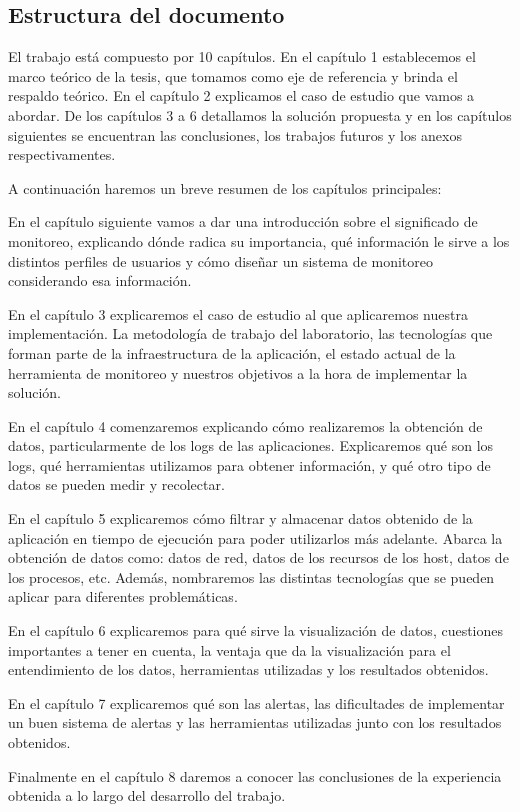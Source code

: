 \subsection{Estructura del documento}
\label{estructura}
El trabajo está compuesto por 10 capítulos. En el capítulo 1 establecemos el marco teórico de la tesis, que tomamos como eje de referencia y brinda el respaldo teórico. En el capítulo 2 explicamos el caso de estudio que vamos a abordar. De los capítulos 3 a 6 detallamos la solución propuesta y en los capítulos siguientes se encuentran las conclusiones, los trabajos futuros y los anexos respectivamentes.

A continuación haremos un breve resumen de los capítulos principales:

En el capítulo siguiente vamos a dar una introducción sobre el significado de monitoreo, explicando dónde radica su importancia, qué información le sirve a los distintos perfiles de usuarios y cómo diseñar un sistema de monitoreo considerando esa información.

En el capítulo 3 explicaremos el caso de estudio al que aplicaremos nuestra implementación. La metodología de trabajo del laboratorio, las tecnologías que forman parte de la infraestructura de la aplicación, el estado actual de la herramienta de monitoreo y nuestros objetivos a la hora de implementar la solución.

En el capítulo 4 comenzaremos explicando cómo realizaremos la obtención de datos, particularmente de los logs de las aplicaciones. Explicaremos qué son los logs, qué herramientas utilizamos para obtener información, y qué otro tipo de datos se pueden medir y recolectar.

En el capítulo 5 explicaremos cómo filtrar y almacenar datos obtenido de la aplicación en tiempo de ejecución para poder utilizarlos más adelante. Abarca la obtención de datos como: datos de red, datos de los recursos de los host, datos de los procesos, etc. Además, nombraremos las distintas tecnologías que se pueden aplicar para diferentes problemáticas.

En el capítulo 6 explicaremos para qué sirve la visualización de datos, cuestiones importantes a tener en cuenta, la ventaja que da la visualización para el entendimiento de los datos, herramientas utilizadas y los resultados obtenidos.

En el capítulo 7 explicaremos qué son las alertas, las dificultades de implementar un buen sistema de alertas y las herramientas utilizadas junto con los resultados obtenidos.

Finalmente en el capítulo 8 daremos a conocer las conclusiones de la experiencia obtenida a lo largo del desarrollo del trabajo.
